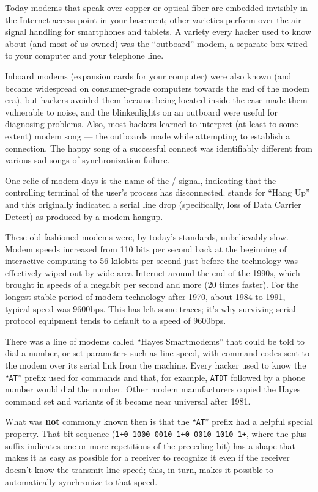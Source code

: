 Today modems that speak over copper or optical fiber are embedded invisibly in
the Internet access point in your basement; other varieties perform
over-the-air signal handling for smartphones and tablets. A variety every
hacker used to know about (and most of us owned) was the ``outboard'' modem, a
separate box wired to your computer and your telephone line.

Inboard modems (expansion cards for your computer) were also known (and became
widespread on consumer-grade computers towards the end of the modem era), but
hackers avoided them because being located inside the case made them vulnerable
to  noise, and the blinkenlights on an outboard were useful for diagnosing
problems. Also, most hackers learned to interpret (at least to some extent)
modem song --- the outboards made while attempting to establish a connection. The
happy song of a successful connect was identifiably different from various sad
songs of synchronization failure.

One relic of modem days is the name of the \UNIX/  signal, indicating that
the controlling terminal of the user's process has disconnected.  stands for
``Hang Up'' and this originally indicated a serial line drop (specifically, loss
of Data Carrier Detect) as produced by a modem hangup.

These old-fashioned modems were, by today's standards, unbelievably slow. Modem
speeds increased from 110 bits per second back at the beginning of interactive
computing to 56 kilobits per second just before the technology was effectively
wiped out by wide-area Internet around the end of the 1990s, which brought in
speeds of a megabit per second and more (20 times faster). For the longest
stable period of modem technology after 1970, about 1984 to 1991, typical speed
was 9600bps. This has left some traces; it's why surviving serial-protocol
equipment tends to default to a speed of 9600bps.

There was a line of modems called ``Hayes Smartmodems'' that could be told to
dial a number, or set parameters such as line speed, with command codes sent to
the modem over its serial link from the machine. Every hacker used to know the
``{\tt AT}'' prefix used for commands and that, for example, {\tt ATDT} followed by a phone
number would dial the number. Other modem manufacturers copied the Hayes
command set and variants of it became near universal after 1981.

What was {\bf not} commonly known then is that the ``{\tt AT}'' prefix had a helpful special
property. That bit sequence ({\tt 1+0 1000 0010 1+0 0010 1010 1+}, where the plus
suffix indicates one or more repetitions of the preceding bit) has a shape that
makes it as easy as possible for a receiver to recognize it even if the
receiver doesn't know the transmit-line speed; this, in turn, makes it possible
to automatically synchronize to that speed.

